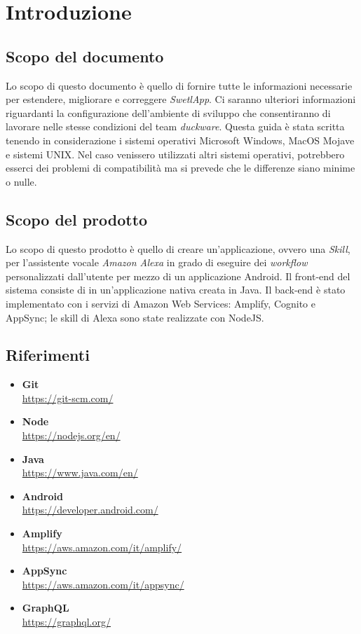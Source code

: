 \pagebreak
\section{Introduzione}
\label{sec:intro}
\subsection{Scopo del documento}
Lo scopo di questo documento è quello di fornire tutte le informazioni necessarie per estendere, migliorare e correggere \textit{SwetlApp}. Ci saranno ulteriori informazioni riguardanti la configurazione dell'ambiente di sviluppo che consentiranno di lavorare nelle stesse condizioni del team \textit{duckware}. 
Questa guida è stata scritta tenendo in considerazione i sistemi operativi Microsoft Windows, MacOS Mojave e sistemi UNIX. Nel caso venissero utilizzati altri sistemi operativi, potrebbero esserci dei problemi di compatibilità ma si prevede che le differenze siano minime o nulle.
\subsection{Scopo del prodotto}
Lo scopo di questo prodotto è quello di creare un'applicazione, ovvero una \textit{Skill}, per l'assistente vocale \textit{Amazon Alexa} in grado di eseguire dei \textit{workflow} personalizzati dall'utente per mezzo di un applicazione Android.
Il front-end del sistema consiste di in un'applicazione nativa creata in Java. Il back-end è stato implementato con i servizi di Amazon Web Services: Amplify, Cognito e AppSync; le skill di Alexa sono state realizzate con NodeJS.
\subsection{Riferimenti}
\begin{itemize}
    \item \textbf{Git}\\ \href{https://git-scm.com/}{https://git-scm.com/}
    \item \textbf{Node}\\ \href{https://nodejs.org/en/}{https://nodejs.org/en/}
    \item \textbf{Java}\\ \href{https://www.java.com/en/}{https://www.java.com/en/}
    \item \textbf{Android}\\ \href{https://developer.android.com/}{https://developer.android.com/}
    \item \textbf{Amplify}\\ \href{https://aws.amazon.com/it/amplify/}{https://aws.amazon.com/it/amplify/}
    \item \textbf{AppSync}\\ \href{https://aws.amazon.com/it/appsync/}{https://aws.amazon.com/it/appsync/}
    \item \textbf{GraphQL}\\ \href{https://graphql.org/}{https://graphql.org/}
    
\end{itemize}